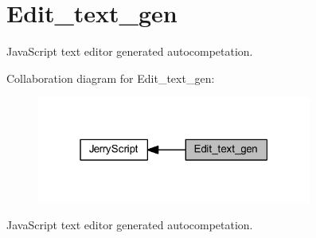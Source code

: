 \section{Edit\+\_\+text\+\_\+gen}
\label{group___edit__text__gen}


Java\+Script text editor generated autocompetation.  


Collaboration diagram for Edit\+\_\+text\+\_\+gen\+:
\nopagebreak
\begin{figure}[H]
\begin{center}
\leavevmode
\includegraphics[width=256pt]{group___edit__text__gen}
\end{center}
\end{figure}
Java\+Script text editor generated autocompetation. 

